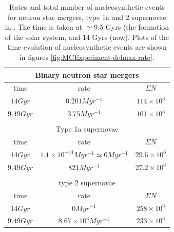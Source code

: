 \begin{table}[h]
  \centering
  \begin{tabular}{|c|c|c|}
    \multicolumn{3}{c}{Binary neutron star mergers} \\ \hline
    time & rate & $\Sigma N$ \\ \hline 
    $14 Gyr$ & $0.201 Myr^{-1}$ & $114 \times 10^3$ \\ \hline 
    $9.49 Gyr$ & $3.75 Myr^{-1}$ & $101 \times 10^3$ \\ \hline
    \multicolumn{3}{c}{} \\
    \multicolumn{3}{c}{Type 1a supernovae} \\ \hline
    time & rate & $\Sigma N$ \\ \hline 
    $14 Gyr$ & $1.1 \times 10^{-44} Myr^{-1} \simeq 0 Myr^{-1}$ & $29.6 \times 10^{6}$ \\ \hline 
    $9.49 Gyr$ & $821 Myr^{-1}$ & $27.2 \times 10^{6}$ \\ \hline
    \multicolumn{3}{c}{} \\
    \multicolumn{3}{c}{type 2 supernovae} \\ \hline
    time & rate & $\Sigma N$ \\ \hline 
    $14 Gyr$ & $0 Myr^{-1}$ & $258 \times 10^{6}$ \\ \hline 
    $9.49 Gyr$ & $8.67 \times 10^{3} Myr^{-1}$ & $233 \times 10^{6}$ \\ \hline
  \end{tabular}
  \caption[Rates and numbers of nucleosynthetic events in \expone]{\label{tab:nucleosynthetic-events}
    Rates and total number of nucleosynthetic events for neuron star mergers, type 1a and 2 supernovae in \omegamodel.
    The time is taken at $\simeq$9.5 Gyrs (the formation of the solar system, and 14 Gyrs (now).
    Plots of the time evolution of nucleosynthetic events are shown in figures \ref{fig:MCExperiment-delmax-rate}.
  }
\end{table}

